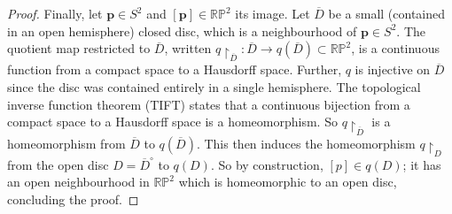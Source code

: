 \documentclass[a4paper]{article}
\begin{document}
\begin{example}
\begin{proof}
		Finally, let \( \mathbf p \in S^2 \) and \( [\mathbf p] \in \mathbb R \mathbb P^2 \) its image.
		Let \( \overline D \) be a small (contained in an open hemisphere) closed disc, which is a neighbourhood of \( \mathbf p \in S^2 \).
		The quotient map restricted to \( \overline D \), written \( q\restriction_{\overline D} \colon \overline D \to q(\overline D) \subset \mathbb R \mathbb P^2 \), is a continuous function from a compact space to a Hausdorff space.
		Further, \( q \) is injective on \( \overline D \) since the disc was contained entirely in a single hemisphere.
		The topological inverse function theorem (TIFT) states that a continuous bijection from a compact space to a Hausdorff space is a homeomorphism.
		So \( q\restriction_{\overline D} \) is a homeomorphism from \( \overline D \) to \( q(\overline D) \).
		This then induces the homeomorphism \( q\restriction_{D} \) from the open disc \( D = {\overline D}^\circ \) to \( q(D) \).
		So by construction, \( [p] \in q(D) \); it has an open neighbourhood in \( \mathbb R \mathbb P^2 \) which is homeomorphic to an open disc, concluding the proof.
	\end{proof}
\end{example}
\end{document}
